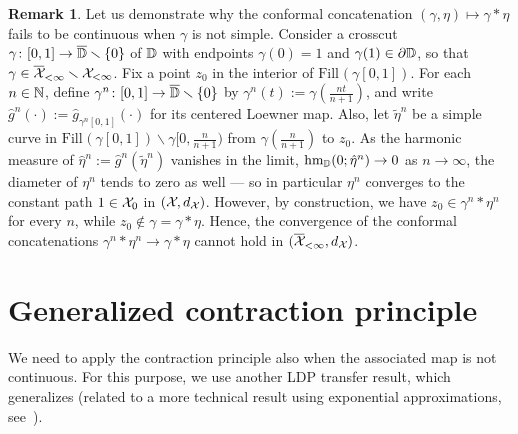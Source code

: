 \documentclass[a4paper, 11pt]{article}
\theoremstyle{definition}
\newtheorem{remark}[thm]{Remark}
\numberwithin{equation}{section}
\numberwithin{figure}{section}
\newcommand{\concat}{*}
\newcommand{\filling}[2][]{\mathrm{Fill}_{#1}(#2)}
\newcommand{\Dpaths}[1][]{\cX_{#1}}
\newcommand{\Dfinpathscl}{\overline{\Dpaths}_{<\infty}}
\newcommand{\dDpaths}[1][]{d_{\Dpaths[#1]}}
\newcommand{\harmonicmeasure}[3]{\mathrm{hm}_{#1}(#2;#3)}
\begin{document}
\begin{remark}\label{rem:convergence-of-concatenations}
Let us demonstrate why the conformal concatenation $(\gamma, \eta) \mapsto \gamma\concat\eta$  fails to be continuous when 
$\gamma$ is not simple. Consider a crosscut $\gamma \colon [0,1] \to \overline{\mathbb{D}}\smallsetminus\{0\}$ of $\mathbb{D}$ with endpoints $\gamma(0) = 1$ and $\gamma(1) \in \partial\mathbb{D}$, so that $\gamma \in \Dfinpathscl \smallsetminus \Dpaths[<\infty]$.
Fix a point $z_0$ in the interior of $\filling{\gamma[0,1]}$. 
For each $n \in \mathbb{N}$, define $\gamma^n \colon [0,1] \to \overline{\mathbb{D}}\smallsetminus\{0\}$ by $\gamma^n(t) := \gamma(\frac{nt}{n+1})$, 
and write $\hat g^n(\cdot) := \hat g_{\gamma^n[0,1]}(\cdot)$ for its centered Loewner map. 
Also, let $\tilde{\eta}^n$ be a simple curve in $\filling{\gamma[0,1]}\smallsetminus \gamma[0, \tfrac{n}{n+1})$ from $\gamma(\tfrac{n}{n+1})$ to $z_0$. 
As the harmonic measure of $\hat\eta^n := \hat g^n(\tilde{\eta}^n)$ vanishes in the limit, 
$\harmonicmeasure{\bD}{0}{\hat \eta^n} \to 0$ as $n \to \infty$, 
the diameter of $\eta^n$ tends to zero as well
--- so in particular $\eta^n$ converges to the constant path $1 \in \Dpaths[0]$ in $(\Dpaths, \dDpaths)$. 
However, by construction, we have $z_0 \in \gamma^n \concat \eta^n$ for every $n$, while $z_0 \notin \gamma = \gamma \concat \eta$.
Hence, the convergence of the conformal concatenations $\gamma^n \concat \eta^n \to \gamma \concat \eta$ cannot hold in $(\Dfinpathscl,\dDpaths)$.
\end{remark}%

\newpage

\section{Generalized contraction principle} 
\label{app:contraction-principle-generalized}
We need to apply the contraction principle also when the associated map is not continuous. 
For this purpose, we use another LDP transfer result, 
which generalizes  
(related to a more technical result using exponential approximations, 
see~\cite[Theorem~4.2.16]{Dembo-Zeitouni:Large_deviations_techniques_and_applications}).
\end{document}
